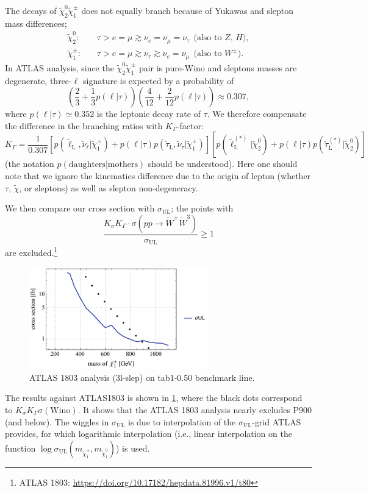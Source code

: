 \documentclass[a4paper,10pt,captions=tableheading,DIV=14]{scrartcl}
\numberwithin{equation}{section}
\newcommand\w[1]{_{\mathrm{#1}}}
\newcommand\neut  [1][\relax]{{\tilde\chi^0_{#1}}}
\newcommand\charPM[1][\relax]{{\tilde\chi^\pm_{#1}}}
\begin{document}
The decays of $\neut[2]\charPM[1]$ does not equally branch because of Yukawas and slepton mass differences;
\begin{align}
 \neut[2]:&\quad\tau > e = \mu \gtrsim \nu_e = \nu_\mu=\nu_\tau ~~\text{(also to $Z$, $H$)},
\\
 \charPM[1]:&\quad\tau > e = \mu \gtrsim \nu_\tau\gtrsim \nu_e=\nu_\mu ~~\text{(also to $W^\pm$)}.
\end{align}
In ATLAS analysis, since the $\neut[2]\charPM[1]$ pair is pure-Wino and sleptons masses are degenerate, three-$\ell$ signature is expected by a probability of
\begin{equation}
 \left(\frac23+\frac13p(\ell|\tau)\right)
 \left(\frac4{12}+\frac{2}{12}p(\ell|\tau)\right)\approx0.307,
\end{equation}
where $p(\ell|\tau)\simeq0.352$ is the leptonic decay rate of $\tau$.
We therefore compensate the difference in the branching ratios with $K_\Gamma$-factor:
\begin{equation}
 K_\Gamma = \frac{1}{0.307}
\left[
 p(\tilde\ell\w L,\tilde\nu_\ell|\charPM[1])
+ p(\ell|\tau)p(\tilde\tau\w L,\tilde\nu_\tau|\charPM[1])
\right]
\left[
 p(\tilde\ell\w L^{(*)}|\neut[2])
+ p(\ell|\tau)p(\tilde\tau\w L^{(*)}|\neut[2])
\right]
\end{equation}
(the notation $p(\text{daughters}|\text{mothers})$ should be understood).
Here one should note that we ignore the kinematics difference due to the origin of lepton (whether $\tau$, $\tilde\chi$, or sleptons) as well as slepton non-degeneracy.

We then compare our cross section with $\sigma\w{UL}$; the points with
\begin{equation}
 \frac{K_\sigma K_\Gamma\cdot \sigma(pp\to\tilde W^\pm\tilde W^3)}{\sigma\w{UL}} \ge 1
\end{equation}
are excluded.\footnote{
ATLAS 1803: \url{https://doi.org/10.17182/hepdata.81996.v1/t80}
}
\begin{figure}[h]
  \centering
  \includegraphics[height=125pt]{../plots/plot_data_tab1_x050_atlas1803.pdf}
  \caption{\label{fig:tab1_x050_atlas1803}ATLAS 1803 analysis (3l-slep) on tab1-0.50 benchmark line.}
\end{figure}

The results against ATLAS1803 is shown in \cref{fig:tab1_x050_atlas1803}, where the black dots correspond to $K_\sigma K_\Gamma \sigma(\text{Wino})$.
It shows that the ATLAS 1803 analysis nearly excludes P900 (and below).
The wiggles in $\sigma\w{UL}$ is due to interpolation of the $\sigma\w{UL}$-grid ATLAS provides, for which logarithmic interpolation (i.e., linear interpolation on the function $\log\sigma\w{UL}(m_{\charPM[1]},m_{\neut[1]})$) is used.





\end{document}
